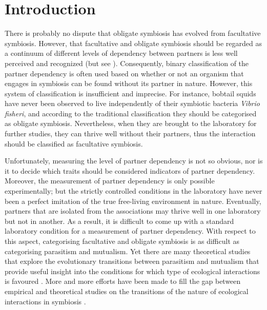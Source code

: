 \documentclass[11.5pt]{article}
\begin{document}
\section{Introduction}
There is probably no dispute that obligate symbiosis has evolved from facultative symbiosis. However, that facultative and obligate symbiosis should be regarded as a continuum of different levels of dependency between partners is less well perceived and recognized (but see \cite{Fisher2017}). Consequently, binary classification of the partner dependency is often used based on whether or not an organism that engages in symbiosis can be found without its partner in nature. However, this system of classification is insufficient and imprecise. For instance, bobtail squids have never been observed to live independently of their symbiotic bacteria \textit{Vibrio fisheri}, and according to the traditional classification they should be categorised as obligate symbiosis. Nevertheless, when they are brought to the laboratory for further studies, they can thrive well without their partners, thus the interaction should be classified as facultative symbiosis. 

\medskip

Unfortunately, measuring the level of partner dependency is not so obvious, nor is it to decide which traits should be considered indicators of partner dependency. Moreover, the measurement of partner dependency is only possible experimentally; but the strictly controlled conditions in the laboratory have never been a perfect imitation of the true free-living environment in nature. Eventually, partners that are isolated from the associations may thrive well in one laboratory but not in another. As a result, it is difficult to come up with a standard laboratory condition for a measurement of partner dependency. With respect to this aspect, categorising facultative and obligate symbiosis is as difficult as categorising parasitism and mutualism. Yet there are many theoretical studies that explore the evolutionary transitions between parasitism and mutualism that provide useful insight into the conditions for which type of ecological interactions is favoured \parencite{VanBaalen2001, Yamamura1993, Neuhauser2004}. More and more efforts have been made to fill the gap between empirical and theoretical studies on the transitions of the nature of ecological interactions in symbiosis \parencite{Canestrari2014, Sachs2011, Sachs2014}.

\medskip
\end{document}
